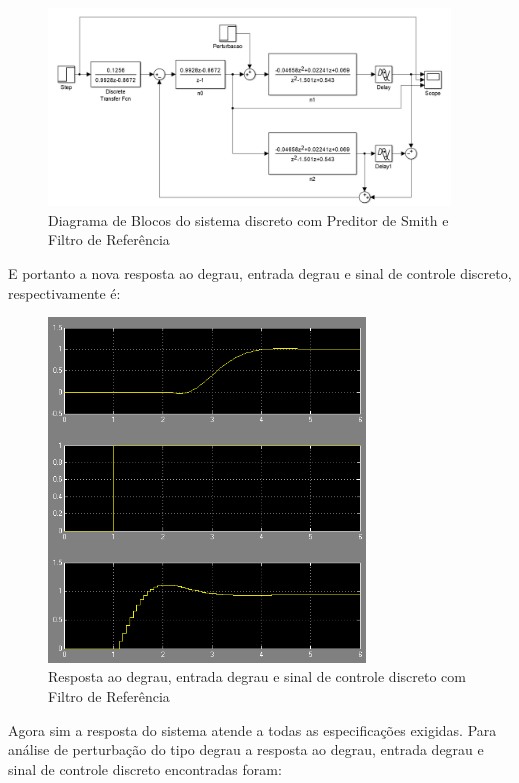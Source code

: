 \documentclass[a4paper,12pt]{article}
\begin{document}
 \begin{figure}[H]
  \centering
  \includegraphics[width=0.95\textwidth]{Imagens/q11p.png}
  \caption{Diagrama de Blocos do sistema discreto com Preditor de Smith e Filtro de Referência}
  \end{figure}

E portanto a nova resposta ao degrau, entrada degrau e sinal de controle discreto, respectivamente é:

   \begin{figure}[H]
  \centering
  \includegraphics[width=0.75\textwidth]{Imagens/q13.png}
  \caption{Resposta ao degrau, entrada degrau e sinal de controle discreto com Filtro de Referência}
  \end{figure}

  Agora sim a resposta do sistema atende a todas as especificações exigidas. Para análise de perturbação do tipo degrau a resposta ao degrau, entrada degrau e sinal de controle discreto encontradas foram:
\end{document}
